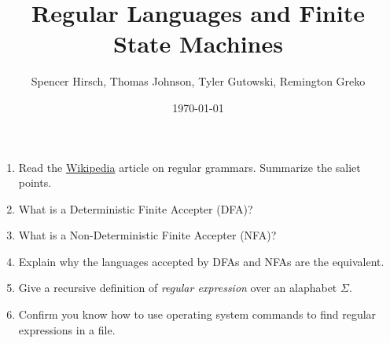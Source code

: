 \documentclass{article}
\begin{document}
\title{Regular Languages and Finite State Machines}
\author{Spencer Hirsch, Thomas Johnson, Tyler Gutowski, Remington Greko}
\date{\today}

\maketitle

\begin{enumerate}
    \item Read the \href{https://en.wikipedia.org/wiki/Regular_grammar}{Wikipedia} article on regular grammars. Summarize
            the saliet points.

    \medskip

    \item What is a Deterministic Finite Accepter (DFA)?
    
    \medskip

    \item What is a Non-Deterministic Finite Accepter (NFA)?
    
    \medskip

    \item Explain why the languages accepted by DFAs and NFAs are the equivalent.
    
    \medskip

    \item Give a recursive definition of \textit{regular expression} over
            an alaphabet $\Sigma$.

    \medskip

    \item Confirm you know how to use operating system commands to find
            regular expressions in a file.

    \medskip
\end{enumerate}
\end{document}
